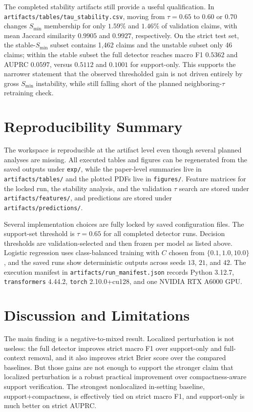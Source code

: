 \documentclass{article}
\newcommand{\smin}{S_{\mathrm{min}}}
\begin{document}
The completed stability artifacts still provide a useful qualification. In \texttt{artifacts/tables/tau\_stability.csv}, moving from $\tau=0.65$ to $0.60$ or $0.70$ changes $\smin$ membership for only $1.59\%$ and $1.46\%$ of validation claims, with mean Jaccard similarity $0.9905$ and $0.9927$, respectively. On the strict test set, the stable-$\smin$ subset contains 1,462 claims and the unstable subset only 46 claims; within the stable subset the full detector reaches macro F1 $0.5362$ and AUPRC $0.0597$, versus $0.5112$ and $0.1001$ for support-only. This supports the narrower statement that the observed thresholded gain is not driven entirely by gross $\smin$ instability, while still falling short of the planned neighboring-$\tau$ retraining check.

\section{Reproducibility Summary}
\label{sec:repro}
The workspace is reproducible at the artifact level even though several planned analyses are missing. All executed tables and figures can be regenerated from the saved outputs under \texttt{exp/}, while the paper-level summaries live in \texttt{artifacts/tables/} and the plotted PDFs live in \texttt{figures/}. Feature matrices for the locked run, the stability analysis, and the validation $\tau$ search are stored under \texttt{artifacts/features/}, and predictions are stored under \texttt{artifacts/predictions/}.

Several implementation choices are fully locked by saved configuration files. The support-set threshold is $\tau=0.65$ for all completed detector runs. Decision thresholds are validation-selected and then frozen per model as listed above. Logistic regression uses class-balanced training with $C$ chosen from $\{0.1,1.0,10.0\}$, and the saved runs show deterministic outputs across seeds $13$, $21$, and $42$. The execution manifest in \texttt{artifacts/run\_manifest.json} records Python 3.12.7, \texttt{transformers} 4.44.2, \texttt{torch} 2.10.0+cu128, and one NVIDIA RTX A6000 GPU.

\section{Discussion and Limitations}
\label{sec:limitations}
The main finding is a negative-to-mixed result. Localized perturbation is not useless: the full detector improves strict macro F1 over support-only and full-context removal, and it also improves strict Brier score over the compared baselines. But those gains are not enough to support the stronger claim that localized perturbation is a robust practical improvement over compactness-aware support verification. The strongest nonlocalized in-setting baseline, support+compactness, is effectively tied on strict macro F1, and support-only is much better on strict AUPRC.
\end{document}
